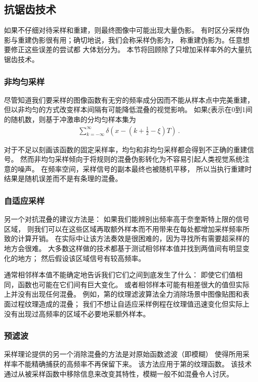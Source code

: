 \subsection{抗锯齿技术}\label{sub:抗锯齿技术}
如果不仔细对待采样和重建，则最终图像中可能出现大量伪影。
有时区分采样伪影与重建伪影很有用；确切地说，我们会称采样伪影为，
称重建伪影为。任意想要修正这些误差的尝试都
大体划分为。
本节将回顾除了只增加采样率外的大量抗锯齿技术。

\subsubsection*{非均匀采样}
尽管知道我们要采样的图像函数有无穷的频率成分因而不能从样本点中完美重建，
但以非均匀的方式改变样本间隔有可能降低混叠的视觉影响。
如果$\xi$表示在0到1间的随机数，则基于冲激串的分均匀样本集为
\begin{align*}
    \sum\limits_{k=-\infty}^{\infty}\delta\left(x-(k+\frac{1}{2}-\xi)T\right)\, .
\end{align*}

对于不足以刻画该函数的固定采样率，均匀和非均匀采样都会得到不正确的重建信号。
然而非均匀采样倾向于将规则的混叠伪影转化为不容易引起人类视觉系统注意的噪声。
在频率空间，采样信号的副本最终也被随机平移，
所以当执行重建时结果是随机误差而不是有条理的混叠。

\subsubsection*{自适应采样}
另一个对抗混叠的建议方法是：
如果我们能辨别出频率高于奈奎斯特上限的信号区域，
则我们可以在这些区域再取额外样本而不用带来在每处都增加采样频率所致的计算开销。
在实际中让该方法奏效是很困难的，因为寻找所有需要超采样的地方会很难。
大多数这样做的技术都基于测试相邻样本值并找到两值间有明显变化的地方；
然后假设该区域信号有较高频率。

通常相邻样本值不能确定地告诉我们它们之间到底发生了什么：
即使它们值相同，函数也可能在它们间有巨大变化。
或者相邻样本可能有相差很大的值但实际上并没有出现任何混叠。
例如，第的纹理滤波算法全力消除场景中图像贴图和表面过程纹理造成的混叠；
我们不想让自适应采样例程在纹理值迅速变化但实际上没有出现过高频率的区域不必要地采额外样本。

\subsubsection*{预滤波}
采样理论提供的另一个消除混叠的方法是对原始函数滤波（即模糊）
使得所用采样率不能精确捕获的高频率不再保留下来。
该方法应用于第的纹理函数。
该技术通过从被采样函数中移除信息来改变其特性，模糊一般不如混叠令人讨厌。

